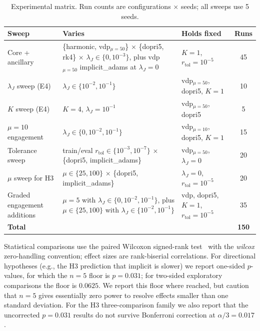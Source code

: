 \documentclass[11pt]{article}
\theoremstyle{plain}
\theoremstyle{definition}
\begin{document}
\begin{table}[t]
\centering
\small
\caption{Experimental matrix. Run counts are configurations $\times$ seeds;
  all sweeps use 5 seeds.}
\label{tab:cells}
\begin{tabular}{@{}p{} p{} p{} c@{}}
\toprule
Sweep & Varies & Holds fixed & Runs \\
\midrule
Core + ancillary  & \{harmonic, vdp$_{\mu=50}$\} $\times$ \{dopri5, rk4\} $\times$ $\lambda_J \in \{0, 10^{-3}\}$, plus vdp$_{\mu=50}$ implicit\_adams at $\lambda_J=0$ & $K=1$, $r_\text{tol}=10^{-5}$ & 45 \\
\addlinespace[2pt]
$\lambda_J$ sweep (E4) & $\lambda_J \in \{10^{-2}, 10^{-1}\}$ & vdp$_{\mu=50}$, dopri5, $K{=}1$ & 10 \\
\addlinespace[2pt]
$K$ sweep (E4) & $K=4$, $\lambda_J = 10^{-1}$ & vdp$_{\mu=50}$, dopri5 & 5 \\
\addlinespace[2pt]
$\mu{=}10$ engagement & $\lambda_J \in \{0, 10^{-2}, 10^{-1}\}$ & vdp$_{\mu=10}$, dopri5, $K{=}1$ & 15 \\
\addlinespace[2pt]
Tolerance sweep & train/eval $r_\text{tol} \in \{10^{-3}, 10^{-7}\}$ $\times$ \{dopri5, implicit\_adams\} & vdp$_{\mu=50}$, $\lambda_J{=}0$ & 20 \\
\addlinespace[2pt]
$\mu$ sweep for H3 & $\mu \in \{25, 100\}$ $\times$ \{dopri5, implicit\_adams\} & $\lambda_J{=}0$, $r_\text{tol}{=}10^{-5}$ & 20 \\
\addlinespace[2pt]
Graded engagement additions & $\mu{=}5$ with $\lambda_J \in \{0, 10^{-2}, 10^{-1}\}$, plus $\mu \in \{25,100\}$ with $\lambda_J \in \{10^{-2},10^{-1}\}$ & vdp, dopri5, $K{=}1$, $r_\text{tol}{=}10^{-5}$ & 35 \\
\midrule
\textbf{Total} & & & \textbf{150} \\
\bottomrule
\end{tabular}
\end{table}

Statistical comparisons use the paired Wilcoxon signed-rank
test~\citep{wilcoxon1945individual} with the \emph{wilcox} zero-handling
convention; effect sizes are rank-biserial correlations. For directional
hypotheses (e.g., the H3 prediction that implicit is slower) we report
one-sided $p$-values, for which the $n = 5$ floor is $p = 0.031$; for
two-sided exploratory comparisons the floor is $0.0625$. We report this
floor where reached, but caution that $n = 5$ gives essentially zero power
to resolve effects smaller than one standard deviation. For the H3
three-comparison family we also report that the uncorrected $p=0.031$ results
do not survive Bonferroni correction at $\alpha/3 = 0.017$.
\end{document}
